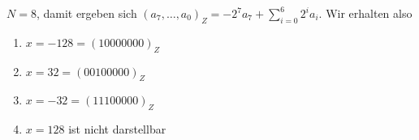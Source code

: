 $N = 8$, damit ergeben sich 
$(a_7, \dots, a_0)_{Z} = -2^{7}a_7 + \sum_{i=0}^{6} 2^i a_i$. Wir erhalten also
\begin{enumerate}
	\item $x = -128 = (10000000)_{Z}$
	\item $x = 32 =  (00100000)_{Z}$
	\item $x = -32 = (11100000)_{Z}$
	\item $x = 128$ ist nicht darstellbar
\end{enumerate}
